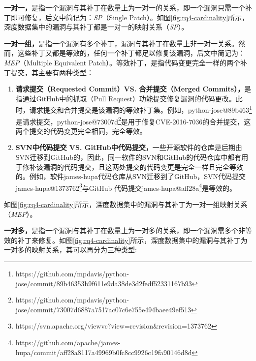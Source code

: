 \textbf{一对一，}是指一个漏洞与其补丁在数量上为一对一的关系，即一个漏洞只需一个补丁即可修复，后文中简记为：\textit{SP}（Single Patch）。如图\ref{fig:rq4-cardinality}所示，深度数据集中的漏洞与其补丁都是一对一的映射关系（\textit{SP}）。

\textbf{一对一组，}是指一个漏洞有多个补丁，漏洞与其补丁在数量上非一对一关系。然而，这些补丁又都是等效的，任何一个补丁都足以修复该漏洞，后文中简记为：\textit{MEP}（Multiple Equivalent Patch）。等效补丁，是指代码变更完全一样的两个补丁提交，其主要有两种类型：
\begin{enumerate}
    \item [（1）] \textbf{请求提交（Requested Commit）VS. 合并提交（Merged Commits），}是指通过GitHub中的抓取（Pull Request）功能提交修复漏洞的代码更改。此时，请求提交和合并提交是该漏洞的等效补丁集。例如，python-jose@89b463\footnote{https://github.com/mpdavis/python-jose/commit/89b46353b9f611e9da38de3d2fedf52331167b93}是请求提交，python-jose@73007d\footnote{https://github.com/mpdavis/python-jose/commit/73007d6887a7517ac07c6e755e494baee49ef513}是用于修复CVE-2016-7036的合并提交，这两个提交的代码变更完全相同，完全等效。
    \item [（2）] \textbf{SVN中代码提交 VS. GitHub中代码提交，}一些开源软件的仓库是后期由SVN迁移到GitHub的，因此，同一软件的SVN和GitHub的代码仓库中都有用于修补该漏洞的代码提交，且这两处提交的代码变更是完全一样且完全等效的。例如，软件james-hupa代码仓库从SVN迁移到了GitHub，SVN代码提交james-hupa@1373762\footnote{https://svn.apache.org/viewvc?view=revision\&revision=1373762}与GitHub 代码提交james-hupa@aff28a\footnote{https://github.com/apache/james-hupa/commit/aff28a8117a49969b0fc8cc9926c19fa90146d8d}是等效的。
\end{enumerate}

如图\ref{fig:rq4-cardinality}所示，深度数据集中的漏洞与其补丁为一对一组映射关系（\textit{MEP}）。

\textbf{一对多，}是指一个漏洞与其补丁在数量上为一对多的关系，即一个漏洞需多个非等效的补丁来修复。如图\ref{fig:rq4-cardinality}所示，深度数据集中的漏洞与其补丁为一对多的映射关系，其可以再分为三种类型: 

